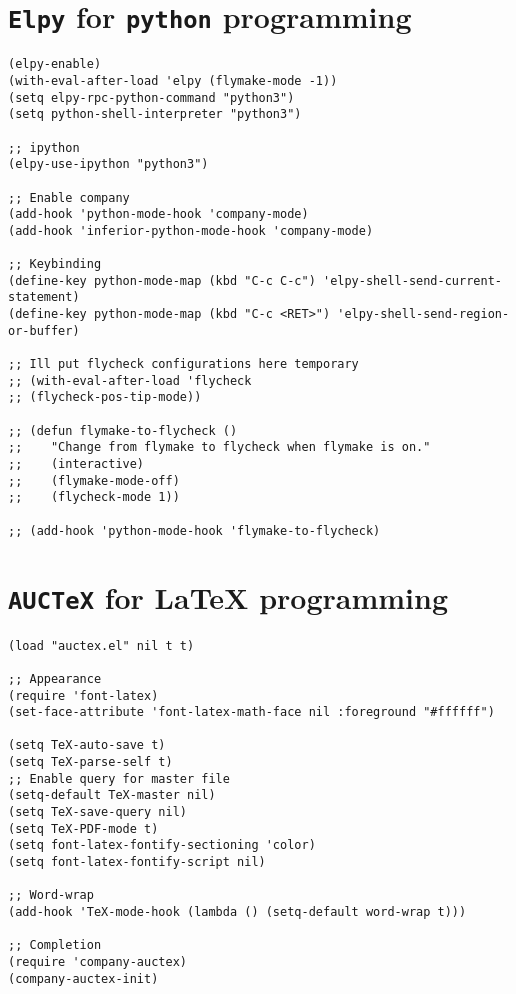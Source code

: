 \documentclass[11pt]{article}
\begin{document}
\section{\texttt{Elpy} for \texttt{python} programming}
\label{sec:org876840b}

\begin{verbatim}
(elpy-enable)				
(with-eval-after-load 'elpy (flymake-mode -1))
(setq elpy-rpc-python-command "python3")
(setq python-shell-interpreter "python3")

;; ipython
(elpy-use-ipython "python3")

;; Enable company
(add-hook 'python-mode-hook 'company-mode)
(add-hook 'inferior-python-mode-hook 'company-mode)

;; Keybinding
(define-key python-mode-map (kbd "C-c C-c") 'elpy-shell-send-current-statement)
(define-key python-mode-map (kbd "C-c <RET>") 'elpy-shell-send-region-or-buffer)

;; Ill put flycheck configurations here temporary
;; (with-eval-after-load 'flycheck
;; (flycheck-pos-tip-mode))

;; (defun flymake-to-flycheck ()
;;    "Change from flymake to flycheck when flymake is on."
;;    (interactive)
;;    (flymake-mode-off)
;;    (flycheck-mode 1))

;; (add-hook 'python-mode-hook 'flymake-to-flycheck)

\end{verbatim}

\section{\texttt{AUCTeX} for \LaTeX{} programming}
\label{sec:orgeba9eab}
\begin{verbatim}
(load "auctex.el" nil t t)

;; Appearance
(require 'font-latex)
(set-face-attribute 'font-latex-math-face nil :foreground "#ffffff")

(setq TeX-auto-save t)			    
(setq TeX-parse-self t)
;; Enable query for master file
(setq-default TeX-master nil)		    
(setq TeX-save-query nil)		    
(setq TeX-PDF-mode t)			    
(setq font-latex-fontify-sectioning 'color) 
(setq font-latex-fontify-script nil)	    

;; Word-wrap
(add-hook 'TeX-mode-hook (lambda () (setq-default word-wrap t)))

;; Completion
(require 'company-auctex)
(company-auctex-init)

\end{verbatim}
\end{document}
